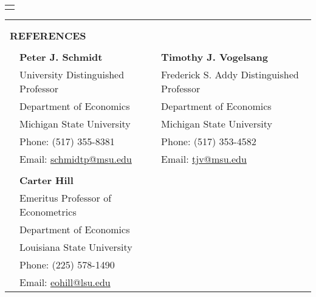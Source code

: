 \documentclass[10pt]{article}
\begin{document}
\begin{center}
\clearpage
\begin{tabular}{llllr}
\hline
\multicolumn{5}{p{460pt}}{}
\end{tabular}
%


\begin{tabular}{llllr}
\multicolumn{5}{l}{}\\\\
\multicolumn{5}{l}{{\Large \textbf{R}}\textbf{EFERENCES}}\\
\multicolumn{1}{p{20pt}}{}&\multicolumn{1}{p{130pt}}{}&\multicolumn{1}{p{70pt}}{}&\multicolumn{1}{p{130pt}}{}&\multicolumn{1}{p{110pt}}{}\\
\multicolumn{1}{p{10pt}}{}&\multicolumn{2}{l}{\textbf{Peter J. Schmidt}} & \multicolumn{2}{l}{\textbf{Timothy J. Vogelsang}} \\
&\multicolumn{2}{l}{University Distinguished Professor} &\multicolumn{2}{l}{Frederick S. Addy Distinguished Professor} \\
&\multicolumn{2}{l}{Department of Economics} &\multicolumn{2}{l}{Department of Economics} \\
&\multicolumn{2}{l}{Michigan State University} &\multicolumn{2}{l}{Michigan State University}\\
&\multicolumn{2}{l}{Phone: (517) 355-8381}&\multicolumn{2}{l}{Phone: (517) 353-4582} \\
&\multicolumn{2}{l}{Email:  \href{mailto:schmidtp@msu.edu}{schmidtp@msu.edu}}&\multicolumn{2}{l}{Email: \href{mailto:tjv@msu.edu}{tjv@msu.edu}}\\ 
\multicolumn{5}{l}{}\\
& \multicolumn{2}{l}{\textbf{Carter Hill}}&\multicolumn{2}{l}{}\\
&\multicolumn{2}{l}{Emeritus Professor of Econometrics}&\multicolumn{2}{l}{}\\
& \multicolumn{2}{l}{Department of Economics}&\multicolumn{2}{l}{}\\
&\multicolumn{2}{l}{Louisiana State University}&\multicolumn{2}{l}{}\\
&\multicolumn{2}{l}{Phone: (225) 578-1490}&\multicolumn{2}{l}{}\\
&\multicolumn{2}{l}{Email:  \href{mailto:eohill@lsu.edu}{eohill@lsu.edu}}&\multicolumn{2}{l}{}
\end{tabular}

\end{center}
\end{document}

